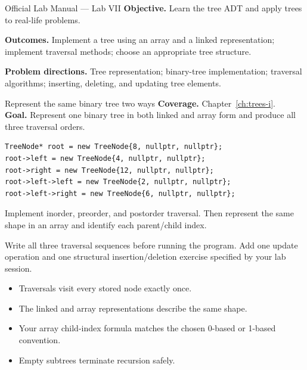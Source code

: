 
\begin{sourcealignment}{Official Lab Manual --- Lab VII}
\textbf{Objective.} Learn the tree ADT and apply trees to real-life problems.

\textbf{Outcomes.} Implement a tree using an array and a linked representation; implement traversal methods; choose an appropriate tree structure.

\textbf{Problem directions.} Tree representation; binary-tree implementation; traversal algorithms; inserting, deleting, and updating tree elements.
\end{sourcealignment}

\begin{labproject}{Represent the same binary tree two ways}
\textbf{Coverage.} Chapter~\ref{ch:trees-i}.\\
\textbf{Goal.} Represent one binary tree in both linked and array form and produce all three traversal orders.

\begin{lstlisting}
TreeNode* root = new TreeNode{8, nullptr, nullptr};
root->left = new TreeNode{4, nullptr, nullptr};
root->right = new TreeNode{12, nullptr, nullptr};
root->left->left = new TreeNode{2, nullptr, nullptr};
root->left->right = new TreeNode{6, nullptr, nullptr};
\end{lstlisting}

Implement inorder, preorder, and postorder traversal. Then represent the same shape in an array and identify each parent/child index.

\begin{tryit}
Write all three traversal sequences before running the program. Add one update operation and one structural insertion/deletion exercise specified by your lab session.
\end{tryit}
\end{labproject}

\begin{verification}
\begin{itemize}
  \item Traversals visit every stored node exactly once.
  \item The linked and array representations describe the same shape.
  \item Your array child-index formula matches the chosen 0-based or 1-based convention.
  \item Empty subtrees terminate recursion safely.
\end{itemize}
\end{verification}

